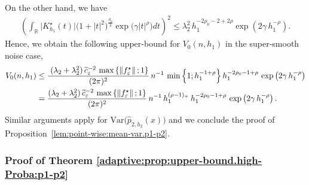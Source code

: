 \documentclass[11pt,a4paper,openany]{article}
\newcommand{\Var}{\mbox{Var}}
\def\R{\mathbb{R}}
\begin{document}
On the other hand, we have 
\begin{align*}
	\left( \int_{\R} \big|   K_{h_{1}}^{\star}(t)   \big|  \big( 1 + |t|^{ 2 } \big)^{\frac{\rho_{0}}{2} }   \exp \big(  \gamma |t|^{\rho}  \big)   dt  \right)^{2}  %
	\leq     \lambda_{2}^{2}  \,  h_{1}^{- 2 \rho_{0}  - 2 + 2 \rho} \exp (2 \gamma \,    h_{1}^{- \rho}).
\end{align*}
Hence, we obtain the following upper-bound for $V_{0}(n,h_{1})$ in the super-smooth noise case, 
\begin{align*}
	V_{0}(n,h_{1})  &\leq  \dfrac{  \hspace{0.1cm} (\lambda_{2} + \lambda_{2}^{2})  \,    \widetilde{c}_{\varepsilon}^{-2}  \,  \max   \left\{  \left\| f_{\varepsilon}^{\star} \right\| ; 1  
		\right\}      }{(2\pi)^{2}} \,   n^{-1}  \,  \min \left\{ 1 ; h_{1}^{-1 + \rho} \right\} h_{1}^{-2 \rho_{0} - 1 + \rho} \,  \exp \big( 2 \gamma   \,  h_{1}^{-\rho}  \big) 
		\\
		&=   \dfrac{  (\lambda_{2} + \lambda_{2}^{2}) \,   \widetilde{c}_{\varepsilon}^{-2}  \,  \max   \left\{  \left\| f_{\varepsilon}^{\star} \right\| ; 1  \right\}    }{(2\pi)^{2}} \,  n^{-1}  \,  h_{1}^{(\rho-1)_{+} }   \,    h_{1}^{- 2  \rho_{0} - 1 + \rho} \,  \exp \big( 2 \gamma   \,   h_{1}^{-\rho}  \big)  
		\,   .    
\end{align*}
Similar arguments apply for $\Var \big(  \widehat{p}_{2,h_{2}}(x) \big)$ and we conclude the proof of Proposition~\ref{lem:point-wise:mean-var.p1-p2}.  
\subsubsection{Proof of Theorem  \ref{adaptive:prop:upper-bound.high-Proba:p1-p2}  
}  
\label{sec:adaptive:prop:upper-bound.high-Proba:p1-p2:proof}   

\medskip  
\end{document}
